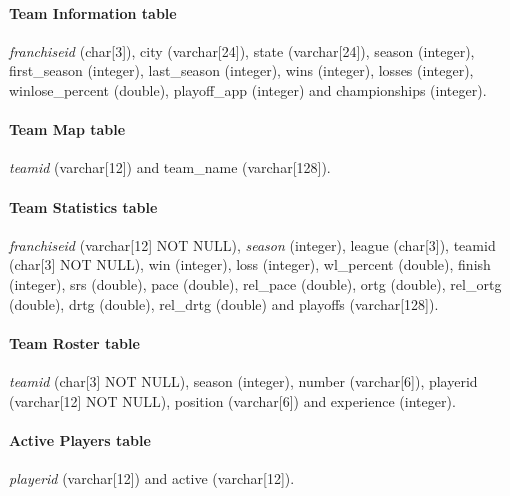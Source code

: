 \paragraph{Team Information table}\textit{franchiseid} (char[3]), city (varchar[24]), state (varchar[24]), season (integer), first\_season (integer), last\_season (integer), wins (integer), losses (integer), winlose\_percent (double), playoff\_app (integer) and championships (integer).

\paragraph{Team Map table}\textit{teamid} (varchar[12]) and team\_name (varchar[128]).

\paragraph{Team Statistics table}\textit{franchiseid} (varchar[12] NOT NULL), \textit{season} (integer), league (char[3]), teamid (char[3] NOT NULL), win (integer), loss (integer), wl\_percent (double), finish (integer), srs (double), pace (double), rel\_pace (double), ortg (double), rel\_ortg (double), drtg (double), rel\_drtg (double) and playoffs (varchar[128]).

\paragraph{Team Roster table}\textit{teamid} (char[3] NOT NULL), season (integer), number (varchar[6]), playerid (varchar[12] NOT NULL), position (varchar[6]) and experience (integer).

\paragraph{Active Players table}\textit{playerid} (varchar[12]) and active (varchar[12]).

